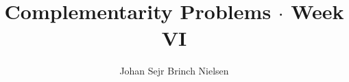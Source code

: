 \makeatletter %
\def\maketitle{%
 \null
 \thispagestyle{empty}%
 \vfill
 \begin{center}\leavevmode
   \normalfont
   \LARGE{\raggedleft \@title\par}%
   \hrulefill\par
   \large{\raggedleft \subtitle\par}%
   \vskip 2cm
   {\today\par}%
 \end{center}%
 \vfill
 \begin{flushleft}
   {\large \@author } \\
   {\footnotesize \suplementInfo }
 \end{flushleft}
 \clearpage %
}
\makeatother %
\title{Complementarity Problems $\cdot$ Week VI}

\def\subtitle{CCO $\cdot$ Constraint Continous Optimization}

\author{Johan Sejr Brinch Nielsen} \def\suplementInfo{

\kern 5pt \hrule width 11pc \kern 5pt

\begin{tabular}{ll}
Email: & zerrez@diku.dk  \\
Cpr.:  & 260886-2547
\end{tabular}

\kern 5pt \hrule width 11pc \kern 5pt

Dept. of Computer Science,  \\
University of Copenhagen

}
